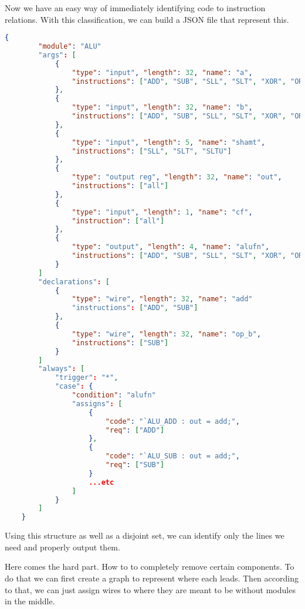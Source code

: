 \documentclass[]{article}
\begin{document}
	Now we have an easy way of immediately identifying code to instruction relations.
	With this classification, we can build a JSON file that represent this.

	\pagebreak
	\begin{lstlisting}[language=json,caption=example JSON]
	{
		"module": "ALU"
		"args": [
			{
				"type": "input", "length": 32, "name": "a",
				"instructions": ["ADD", "SUB", "SLL", "SLT", "XOR", "OR", "SRA", "AND", "ADDI", "SLTI", "SLTIU", "XORI", "ORI", "ANDI", "SLLI", "SRLI", "SRLI", "SRAI"]
			},
			{
				"type": "input", "length": 32, "name": "b",
				"instructions": ["ADD", "SUB", "SLL", "SLT", "XOR", "OR", "SRA", "AND", "ADDI", "SLTI", "SLTIU", "XORI", "ORI", "ANDI", "SLLI", "SRLI", "SRLI", "SRAI"]
			},
			{
				"type": "input", "length": 5, "name": "shamt",
				"instructions": ["SLL", "SLT", "SLTU"]
			},
			{
				"type": "output reg", "length": 32, "name": "out",
				"instructions": ["all"]
			},
			{
				"type": "input", "length": 1, "name": "cf",
				"instruction": ["all"]
			},
			{
				"type": "output", "length": 4, "name": "alufn",
				"instructions": ["ADD", "SUB", "SLL", "SLT", "XOR", "OR", "SRA", "AND", "ADDI", "SLTI", "SLTIU", "XORI", "ORI", "ANDI", "SLLI", "SRLI", "SRLI", "SRAI"]
			}
		]
		"declarations": [
			{
				"type": "wire", "length": 32, "name": "add"
				"instructions": ["ADD", "SUB"]
			},
			{
				"type": "wire", "length": 32, "name": "op_b",
				"instructions": ["SUB"]
			}
		]
		"always": [
			"trigger": "*",
			"case": {
				"condition": "alufn"
				"assigns": [
					{
						"code": "`ALU_ADD : out = add;",
						"req": ["ADD"]
					},
					{
						"code": "`ALU_SUB : out = add;",
						"req": ["SUB"]
					}
					...etc
				]
			}
		]
	}
	\end{lstlisting}

	Using this structure as well as a disjoint set, we can identify only the lines we need and properly output them.

	Here comes the hard part. How to  to completely remove certain components. To do that we can first create a graph to represent where each  leads.
	Then according to that, we can just assign wires to where they are meant to be without modules in the middle.
\end{document}
